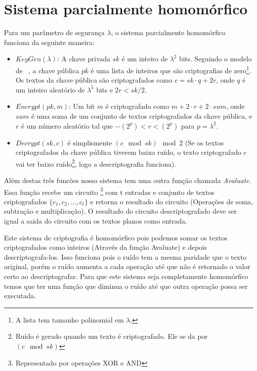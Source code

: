 \section{Sistema parcialmente homomórfico}
Para um parâmetro de segurança $\lambda$, o sistema parcialmente homomórfico funciona da seguinte maneira:
\begin{itemize}
	\item $KeyGen(\lambda)$: A chave privada $sk$ é um inteiro de $\lambda^2$  bits. Seguindo o modelo de ~\cite{rothblum}, a chave pública $pk$ é uma lista de inteiros que são criptografias de zero\footnote{A lista tem tamanho polinomial em $\lambda$.}. Os textos da chave pública são criptografados como $c = sk \cdot q + 2r$, onde $q$ é um inteiro aleatório de $\lambda^5$ bits e $2r < sk/2$.
	\item $Encrypt(pk,m)$: Um bit $m$ é criptografado como $m + 2 \cdot r + 2 \cdot sum$, onde $sum$ é uma soma de um conjunto de textos criptografados da chave pública, e $r$ é um número aleatório tal que $-(2^p) < r < (2^p)$ para $p =  \lambda^2$.
	\item $Decrypt(sk,c)$ é simplismente $(c \mod sk) \mod 2$ (Se os textos criptografados da chave pública tiverem baixo ruído, o texto criptografado $c$ vai ter baixo ruído\footnote{Ruído é gerado quando um texto é criptografado. Ele se da por $(c \mod sk)$}, logo a descriptografia funciona).
\end{itemize}
Além destas três funcões nosso sistema tem uma outra função chamada \textit{Avaluate}. Essa função recebe um circuito \footnote{Representado por operações XOR e AND} com t entradas e conjunto de textos criptografados $\lbrace c_1,c_2,...,c_t \rbrace$ e retorna o resultado do circuito (Operações de soma, subtração e multiplicação). O resultado do circuito descriptografado deve ser igual a saida do circuito com os textos planos como entrada.

Este sistema de criptografia é homomórfico pois podemos somar os textos criptografados como inteiros (Através da função Avaluate) e depois descriptografa-los. Isso funciona pois o ruído tem a mesma paridade que o texto original, porém o ruído aumenta a cada operação até que não é retornado o valor certo ao descriptografar.
Para que este sistema seja completamente homomórfico temos que ter uma função que diminua o ruído até que outra operação possa ser executada.

